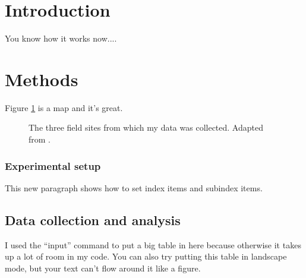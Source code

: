 \begin{framed}
\lipsum[3]
\end{framed}


\newpage
\section{Introduction}
You know how it works now....

\section{Methods}

Figure \ref{2-fig:sites} is a map and it's great.

\begin{figure}[htbp]
    \centering
    \caption[
        The three field sites from which my data was collected
    ]{
        The three field sites from which my data was collected. Adapted from \citet{biancacci_optimisation_2022}.
    } \label{2-fig:sites}
\end{figure}

\subsubsection{Experimental setup}
This new paragraph shows how to set index items
and  subindex items.

\subsection{Data collection and analysis}
I used the ``input'' command to put a big table in here because otherwise it takes up a lot of room in my code.
You can also try putting this table in landscape mode, but your text can't flow around it like a figure. 

